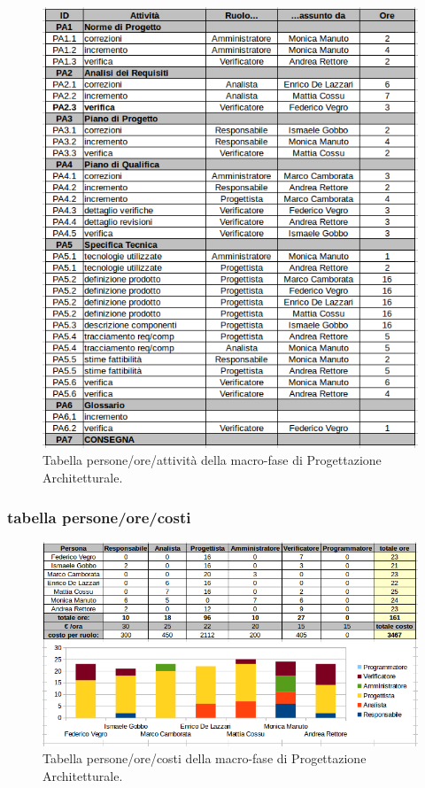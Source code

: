 \begin{figure}[h]
\begin{center}
\includegraphics[scale=0.50]{img/progarc-attivita.png}
\caption{Tabella persone/ore/attività della macro-fase di Progettazione Architetturale.}
\end{center}
\end{figure}
\clearpage

\subsubsection{tabella persone/ore/costi}

\begin{figure}[h]
\begin{center}
\includegraphics[scale=0.50]{img/progarc-personeorecosti.png}
\caption{Tabella persone/ore/costi della macro-fase di Progettazione Architetturale.}
\end{center}
\end{figure}


